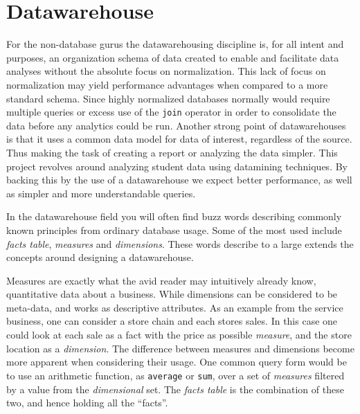 \section{Datawarehouse}
	\noindent
	For the non-database gurus the datawarehousing discipline is, for all intent and purposes, an organization schema of
	data created to enable and facilitate data analyses without the absolute focus on normalization\cite{oracle:dataware}.
	This lack of focus on normalization may yield performance advantages when compared to a more standard schema.
	Since highly normalized databases normally would require multiple queries or excess use of the \texttt{join} operator
	in order to consolidate the data before any analytics could be run. 
	Another strong point of datawarehouses is that it uses a common data model for data of interest, regardless of the source. 
	Thus making the task of creating a report or analyzing the data simpler. 
	This project revolves around analyzing student data using datamining techniques. 
	By backing this by the use of a datawarehouse we expect better performance, as well as simpler and more understandable queries.
	
	
	
	\bigskip\noindent
	In the datawarehouse field you will often find buzz words describing commonly known principles from ordinary database
	usage. Some of the most used include \textit{facts table}, \textit{measures} and \textit{dimensions}.
	These words describe to a large extends the concepts around designing a datawarehouse. 
	
	\bigskip\noindent
	Measures are exactly what the avid reader may intuitively already know, quantitative data about a business.
	While dimensions can be considered to be meta-data, and works as descriptive attributes. 
	As an example from the service business, one can consider a store chain and each stores sales. 
	In this case one could look at each sale as a fact with the price as possible \textit{measure},
	and the store location as a \textit{dimension}. 
	The difference between measures and dimensions become more apparent when considering their usage.
	One common query form would be to use an arithmetic function, as \texttt{average} or \texttt{sum}, over a set of
	\textit{measures} filtered by a value from the \textit{dimensional} set.
	The \textit{facts table} is the combination of these two, and hence holding all the "`facts"'. 
	
